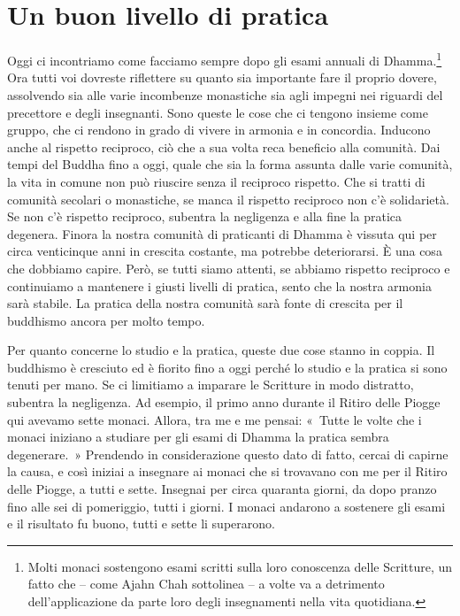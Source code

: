 \chapter{Un buon livello di pratica}

Oggi ci incontriamo come facciamo sempre dopo gli esami annuali di
Dhamma.\footnote{Molti monaci sostengono esami scritti sulla loro
  conoscenza delle Scritture, un fatto che -- come Ajahn Chah sottolinea
  -- a volte va a detrimento dell'applicazione da parte loro degli
  insegnamenti nella vita quotidiana.} Ora tutti voi dovreste riflettere
su quanto sia importante fare il proprio dovere, assolvendo sia alle
varie incombenze monastiche sia agli impegni nei riguardi del precettore
e degli insegnanti. Sono queste le cose che ci tengono insieme come
gruppo, che ci rendono in grado di vivere in armonia e in concordia.
Inducono anche al rispetto reciproco, ciò che a sua volta reca beneficio
alla comunità. Dai tempi del Buddha fino a oggi, quale che sia la forma
assunta dalle varie comunità, la vita in comune non può riuscire senza
il reciproco rispetto. Che si tratti di comunità secolari o monastiche,
se manca il rispetto reciproco non c'è solidarietà. Se non c'è rispetto
reciproco, subentra la negligenza e alla fine la pratica degenera.
Finora la nostra comunità di praticanti di Dhamma è vissuta qui per
circa venticinque anni in crescita costante, ma potrebbe deteriorarsi. È
una cosa che dobbiamo capire. Però, se tutti siamo attenti, se abbiamo
rispetto reciproco e continuiamo a mantenere i giusti livelli di
pratica, sento che la nostra armonia sarà stabile. La pratica della
nostra comunità sarà fonte di crescita per il buddhismo ancora per molto
tempo.

Per quanto concerne lo studio e la pratica, queste due cose stanno in
coppia. Il buddhismo è cresciuto ed è fiorito fino a oggi perché lo
studio e la pratica si sono tenuti per mano. Se ci limitiamo a imparare
le Scritture in modo distratto, subentra la negligenza. Ad esempio, il
primo anno durante il Ritiro delle Piogge qui avevamo sette monaci.
Allora, tra me e me pensai: «~Tutte le volte che i monaci iniziano a
studiare per gli esami di Dhamma la pratica sembra degenerare.~»
Prendendo in considerazione questo dato di fatto, cercai di capirne la
causa, e così iniziai a insegnare ai monaci che si trovavano con me per
il Ritiro delle Piogge, a tutti e sette. Insegnai per circa quaranta
giorni, da dopo pranzo fino alle sei di pomeriggio, tutti i giorni. I
monaci andarono a sostenere gli esami e il risultato fu buono, tutti e
sette li superarono.

